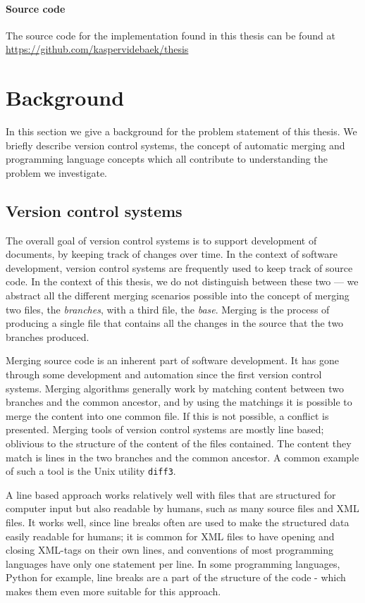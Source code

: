 \documentclass[11pt]{article}
\begin{document}
\paragraph{Source code} The source code for the implementation found in this thesis can be found at \url{https://github.com/kaspervidebaek/thesis}

\clearpage 
\section{Background}
In this section we give a background for the problem statement of this thesis. We briefly describe version control systems, the concept of automatic merging and programming language concepts which all contribute to understanding the problem we investigate.

\subsection{Version control systems}
The overall goal of version control systems is to support development of documents, by keeping track of changes over time. In the context of software development, version control systems are frequently used to keep track of source code. In the context of this thesis, we do not distinguish between these two --- we abstract all the different merging scenarios possible into the concept of merging two files, the \textit{branches}, with a third file, the \textit{base}. Merging is the process of producing a single file that contains all the changes in the source that the two branches produced.

Merging source code is an inherent part of software development. It has gone through some development and automation since the first version control systems. Merging algorithms generally work by matching content between two branches and the common ancestor, and by using the matchings it is possible to merge the content into one common file. If this is not possible, a conflict is presented. Merging tools of version control systems are mostly line based; oblivious to the structure of the content of the files contained. The content they match is lines in the two branches and the common ancestor. A common example of such a tool is the Unix utility \texttt{diff3}.

A line based approach works relatively well with files that are structured for computer input but also readable by humans, such as many source files and XML files. It works well, since line breaks often are used to make the structured data easily readable for humans; it is common for XML files to have opening and closing XML-tags on their own lines, and conventions of most programming languages have only one statement per line. In some programming languages, Python for example, line breaks are a part of the structure of the code - which makes them even more suitable for this approach.
\end{document}
